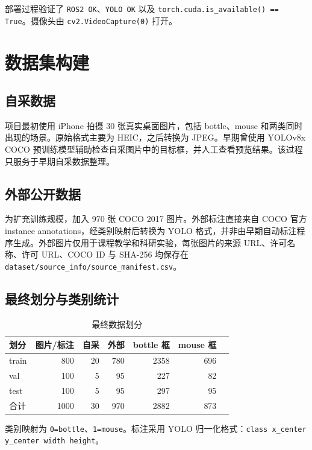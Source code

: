 \documentclass[UTF8,fontset=fandol,a4paper,12pt]{ctexart}
\begin{document}
部署过程验证了 \texttt{ROS2 OK}、\texttt{YOLO OK} 以及 \texttt{torch.cuda.is\_available() == True}。摄像头由 \texttt{cv2.VideoCapture(0)} 打开。

\section{数据集构建}

\subsection{自采数据}

项目最初使用 iPhone 拍摄 30 张真实桌面图片，包括 bottle、mouse 和两类同时出现的场景。原始格式主要为 HEIC，之后转换为 JPEG。早期曾使用 YOLOv8x COCO 预训练模型辅助检查自采图片中的目标框，并人工查看预览结果。该过程只服务于早期自采数据整理。

\subsection{外部公开数据}

为扩充训练规模，加入 970 张 COCO 2017 图片。外部标注直接来自 COCO 官方 instance annotations，经类别映射后转换为 YOLO 格式，并非由早期自动标注程序生成。外部图片仅用于课程教学和科研实验，每张图片的来源 URL、许可名称、许可 URL、COCO ID 与 SHA-256 均保存在 \texttt{dataset/source\_info/source\_manifest.csv}。

\subsection{最终划分与类别统计}

\begin{table}[H]
\centering
\caption{最终数据划分}
\begin{tabular}{lrrrrrr}
\toprule
划分 & 图片/标注 & 自采 & 外部 & bottle 框 & mouse 框 \\
\midrule
train & 800 & 20 & 780 & 2358 & 696 \\
val   & 100 & 5  & 95  & 227  & 82  \\
test  & 100 & 5  & 95  & 297  & 95  \\
\midrule
合计  & 1000 & 30 & 970 & 2882 & 873 \\
\bottomrule
\end{tabular}
\end{table}

类别映射为 \texttt{0=bottle}、\texttt{1=mouse}。标注采用 YOLO 归一化格式：\texttt{class x\_center y\_center width height}。
\end{document}
